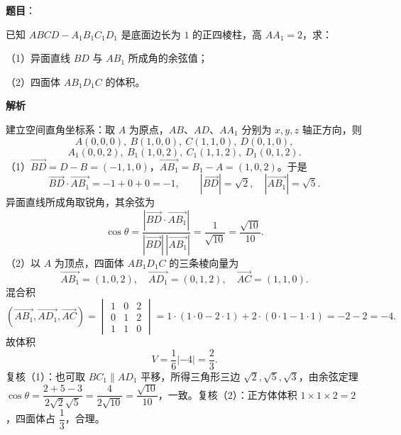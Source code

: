 \begin{answer}

\textbf{题目}：

已知 $ABCD-A_1B_1C_1D_1$ 是底面边长为 $1$ 的正四棱柱，高 $AA_1=2$，求：

（1）异面直线 $BD$ 与 $AB_1$ 所成角的余弦值；

（2）四面体 $AB_1D_1C$ 的体积。
\nopagebreak[4]
\begin{center}\end{center}
\nopagebreak[4]
\textbf{解析}

建立空间直角坐标系：取 $A$ 为原点，$AB$、$AD$、$AA_1$ 分别为 $x,y,z$ 轴正方向，则
\nopagebreak[4]
\[A(0,0,0),\ B(1,0,0),\ C(1,1,0),\ D(0,1,0),\]
\nopagebreak[4]
\[A_1(0,0,2),\ B_1(1,0,2),\ C_1(1,1,2),\ D_1(0,1,2).\]
（1）$\overrightarrow{BD}=D-B=(-1,1,0)$，$\overrightarrow{AB_1}=B_1-A=(1,0,2)$。于是
\nopagebreak[4]
\[\overrightarrow{BD}\cdot\overrightarrow{AB_1}=-1+0+0=-1,\qquad |\overrightarrow{BD}|=\sqrt2,\quad |\overrightarrow{AB_1}|=\sqrt5.\]
异面直线所成角取锐角，其余弦为
\nopagebreak[4]
\[\cos\theta=\frac{\left|\overrightarrow{BD}\cdot\overrightarrow{AB_1}\right|}{|\overrightarrow{BD}|\,|\overrightarrow{AB_1}|}=\frac1{\sqrt{10}}=\frac{\sqrt{10}}{10}.\]
（2）以 $A$ 为顶点，四面体 $AB_1D_1C$ 的三条棱向量为
\nopagebreak[4]
\[\overrightarrow{AB_1}=(1,0,2),\quad \overrightarrow{AD_1}=(0,1,2),\quad \overrightarrow{AC}=(1,1,0).\]
混合积
\nopagebreak[4]
\[\left(\overrightarrow{AB_1},\overrightarrow{AD_1},\overrightarrow{AC}\right)=\begin{vmatrix}1&0&2\\0&1&2\\1&1&0\end{vmatrix}=1\cdot(1\cdot0-2\cdot1)+2\cdot(0\cdot1-1\cdot1)=-2-2=-4.\]
故体积
\nopagebreak[4]
\[V=\frac16\left|-4\right|=\frac23.\]
复核（1）：也可取 $BC_1\parallel AD_1$ 平移，所得三角形三边 $\sqrt2,\sqrt5,\sqrt3$，由余弦定理 $\cos\theta=\dfrac{2+5-3}{2\sqrt2\sqrt5}=\dfrac4{2\sqrt{10}}=\dfrac{\sqrt{10}}{10}$，一致。复核（2）：正方体体积 $1\times1\times2=2$，四面体占 $\dfrac13$，合理。


\end{answer}
